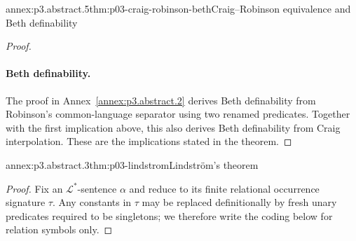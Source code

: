 \begin{annexitem}{annex:p3.abstract.5}{thm:p03-craig-robinson-beth}{Craig--Robinson equivalence and Beth definability}
\begin{proof}
\paragraph{Beth definability.}
The proof in Annex~\ref{annex:p3.abstract.2} derives Beth definability
from Robinson's common-language separator using two renamed predicates.
Together with the first implication above, this also derives Beth
definability from Craig interpolation.
These are the implications stated in the theorem.
\end{proof}
\end{annexitem}

\begin{annexitem}{annex:p3.abstract.3}{thm:p03-lindstrom}{Lindstr\"om's theorem}
\begin{proof}
Fix an \(\mathcal L^*\)-sentence \(\alpha\) and reduce to its finite
relational occurrence signature \(\tau\).  Any constants in \(\tau\) may be
replaced definitionally by fresh unary predicates required to be singletons;
we therefore write the coding below for relation symbols only.


\end{proof}
\end{annexitem}
